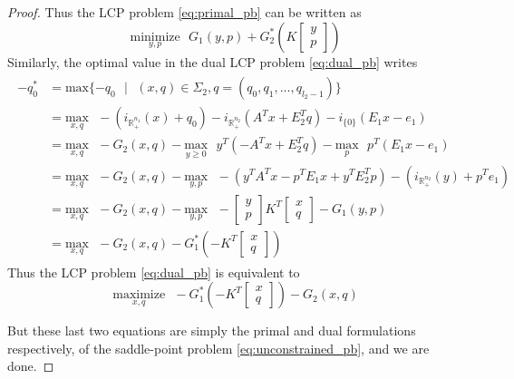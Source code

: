 \documentclass[12pt]{article}
\begin{document}
\begin{proof}
Thus the LCP problem \eqref{eq:primal_pb} can be written as 
\begin{equation}
  \underset{y,p}{\text{minimize}}\text{ }G_1(y,p) + G_2^*\left(K\begin{bmatrix}y\\p\end{bmatrix}\right)
\end{equation}
Similarly, the optimal value in the dual LCP problem \eqref{eq:dual_pb} writes
\begin{eqnarray*}
  \begin{aligned}
 -q_0^* &= \text{max}\{-q_0\text{ }|\text{ } (x, q) \in \Sigma_2, q = (q_0, q_1, ..., q_{l_2-1})\}\\
    &= \underset{x,q}{\text{max}}\text{ }-(i_{\mathbb{R}^{n_1}_+}(x) + q_0) - i_{\mathbb{R}^{n_2}_+}(A^Tx+E_2^Tq) - i_{\{0\}}(E_1x - e_1)\\
    &= \underset{x,q}{\text{max}}\text{ }-G_2(x, q) - \underset{y \geq 0}{\text{max}}\text{ }y^T(-A^Tx + E_2^Tq) - \underset{p}{\text{max}}\text{ }p^T(E_1x-e_1)\\
    &= \underset{x,q}{\text{max}}\text{ }-G_2(x, q) -\underset{y,p}{\text{max}}\text{ }-(y^TA^Tx -p^TE_1x + y^TE_2^Tp)-(i_{\mathbb{R}^{n_2}_+}(y) + p^Te_1)\\
    &= \underset{x,q}{\text{max}}\text{ }-G_2(x, q)-\underset{y,p}{\text{max}}\text{ }-
 \begin{bmatrix}y\\p\end{bmatrix}K^T\begin{bmatrix}x\\q\end{bmatrix}-G_1(y,p)\\
   &= \underset{x,q}{\text{max}}\text{ }-G_2(x, q)-G_1^*\left(-K^T\begin{bmatrix}x\\q\end{bmatrix}\right)
  \end{aligned}
\end{eqnarray*}
Thus the LCP problem \eqref{eq:dual_pb} is equivalent to
\begin{equation}
  \underset{x,q}{\text{maximize}}\text{ }-G_1^*\left(-K^T\begin{bmatrix}x\\q\end{bmatrix}\right) - G_2(x, q)
\end{equation}

But these last two equations are simply the primal and dual formulations respectively, of the saddle-point problem \eqref{eq:unconstrained_pb}, and we are done.


\end{proof}
\end{document}
